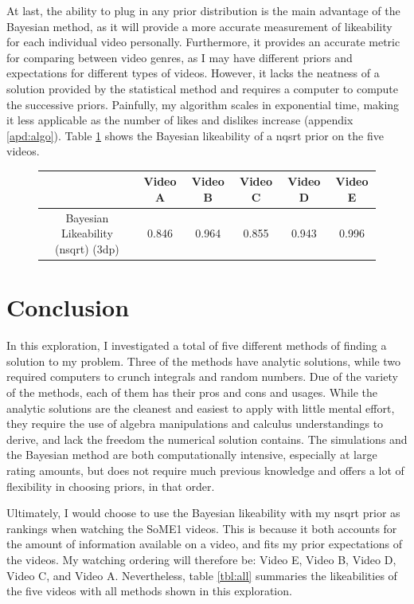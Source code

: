 \documentclass[a4paper,11pt]{article}
\begin{document}
At last, the ability to plug in any prior distribution is the main advantage of the Bayesian method, as it will provide a more accurate measurement of likeability for each individual video personally. Furthermore, it provides an accurate metric for comparing between video genres, as I may have different priors and expectations for different types of videos. However, it lacks the neatness of a solution provided by the statistical method and requires a computer to compute the successive priors. Painfully, my algorithm scales in exponential time, making it less applicable as the number of likes and dislikes increase (appendix \ref{apd:algo}). Table \ref{tbl:baye} shows the Bayesian likeability of a nqsrt prior on the five videos.

\begin{figure}[H]
    \centering
    \begin{tabular}{c|c|c|c|c|c}
        & Video A & Video B & Video C & Video D & Video E \\
        \hline
        \hline
        Bayesian Likeability (nsqrt) (3dp) & 0.846 & 0.964 & 0.855 & 0.943 & 0.996
    \end{tabular}
    \label{tbl:baye}
\end{figure}

\section{Conclusion}
In this exploration, I investigated a total of five different methods of finding a solution to my problem. Three of the methods have analytic solutions, while two required computers to crunch integrals and random numbers. Due of the variety of the methods, each of them has their pros and cons and usages. While the analytic solutions are the cleanest and easiest to apply with little mental effort, they require the use of algebra manipulations and calculus understandings to derive, and lack the freedom the numerical solution contains. The simulations and the Bayesian method are both computationally intensive, especially at large rating amounts, but does not require much previous knowledge and offers a lot of flexibility in choosing priors, in that order.

Ultimately, I would choose to use the Bayesian likeability with my nsqrt prior as rankings when watching the SoME1 videos. This is because it both accounts for the amount of information available on a video, and fits my prior expectations of the videos. My watching ordering will therefore be: Video E, Video B, Video D, Video C, and Video A. Nevertheless, table \ref{tbl:all}  summaries the likeabilities of the five videos with all methods shown in this exploration.
\end{document}
